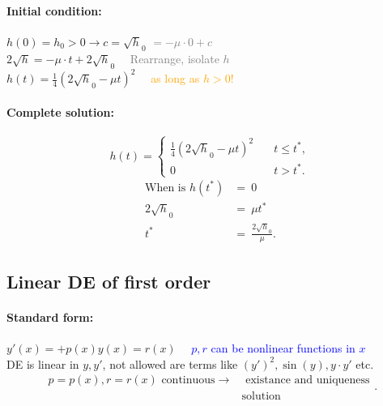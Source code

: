 \documentclass[]{article}
\begin{document}
	\paragraph{Initial condition:} $h(0)= h_0 > 0 \rightarrow c=\sqrt h_0$ \textcolor{gray}{$=-\mu \cdot 0+c$}\\
	$2\sqrt h = -\mu \cdot t + 2\sqrt h_0\quad$ \textcolor{gray}{Rearrange, isolate $h$}\\
	$h(t)= \frac{1}{4}(2\sqrt h_0 - \mu t ) ^{2}\quad$ \textcolor{orange}{as long as $h >0$!}
	\begin{multicols}{2}
	\begin{center}
	\end{center}
	\paragraph{Complete solution:} 
	\[
	h(t) =
	\begin{cases} 
	\frac{1}{4}(2\sqrt h_0-\mu t) ^{2}\quad & t\le t ^{*}, \\
		0 & t >t ^{*}.
	\end{cases}
	\]
	\[
	\begin{split}
		\text{When is }h(t ^{*}) & =~0\\
		2\sqrt h_0 & =~\mu t ^{*}\\
		t ^{*} & = ~ \frac{2\sqrt h_0}{\mu}.
	\end{split}
	\]
	\end{multicols}

	\subsection{Linear DE of first order}
	\paragraph{Standard form:} $ y'(x)=+p(x)y(x)=r(x) \quad$ \textcolor{blue}{$p,r$ can be nonlinear functions in $x$}\\
	DE is linear in $y,y'$, not allowed are terms like $(y') ^{2},\sin(y),y \cdot y'$ etc.
	\[
		\begin{split}
			p=p(x),r=r(x) \text{ continuous} \rightarrow & \text{ existance and uniqueness}  \\
			 & \text{solution}
		\end{split}
	.\]
\end{document}
